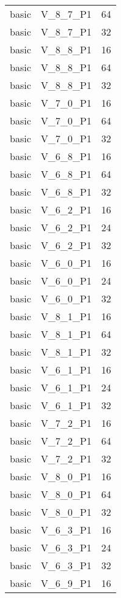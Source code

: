 \begin{longtable}{|c|c|c|}
            basic & V\_8\_7\_P1 & 64 \\
            basic & V\_8\_7\_P1 & 32 \\
            basic & V\_8\_8\_P1 & 16 \\
            basic & V\_8\_8\_P1 & 64 \\
            basic & V\_8\_8\_P1 & 32 \\
            basic & V\_7\_0\_P1 & 16 \\
            basic & V\_7\_0\_P1 & 64 \\
            basic & V\_7\_0\_P1 & 32 \\
            basic & V\_6\_8\_P1 & 16 \\
            basic & V\_6\_8\_P1 & 64 \\
            basic & V\_6\_8\_P1 & 32 \\
            basic & V\_6\_2\_P1 & 16 \\
            basic & V\_6\_2\_P1 & 24 \\
            basic & V\_6\_2\_P1 & 32 \\
            basic & V\_6\_0\_P1 & 16 \\
            basic & V\_6\_0\_P1 & 24 \\
            basic & V\_6\_0\_P1 & 32 \\
            basic & V\_8\_1\_P1 & 16 \\
            basic & V\_8\_1\_P1 & 64 \\
            basic & V\_8\_1\_P1 & 32 \\
            basic & V\_6\_1\_P1 & 16 \\
            basic & V\_6\_1\_P1 & 24 \\
            basic & V\_6\_1\_P1 & 32 \\
            basic & V\_7\_2\_P1 & 16 \\
            basic & V\_7\_2\_P1 & 64 \\
            basic & V\_7\_2\_P1 & 32 \\
            basic & V\_8\_0\_P1 & 16 \\
            basic & V\_8\_0\_P1 & 64 \\
            basic & V\_8\_0\_P1 & 32 \\
            basic & V\_6\_3\_P1 & 16 \\
            basic & V\_6\_3\_P1 & 24 \\
            basic & V\_6\_3\_P1 & 32 \\
            basic & V\_6\_9\_P1 & 16 \\

\end{longtable}
